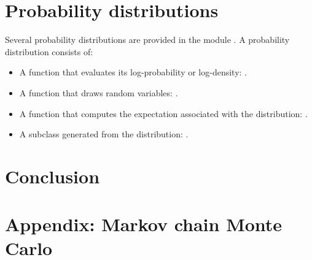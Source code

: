\documentclass[]{manual}
\begin{document}
\chapter{Probability distributions} 
\label{chap:distributions}
Several probability distributions are provided in the module . A probability distribution consists of:
\begin{itemize}
    \item A function that evaluates its log-probability or log-density: .
    \item A function that draws random variables: .
    \item A function that computes the expectation associated with the distribution: .
    \item A  subclass generated from the distribution: .
\end{itemize} 


\chapter{Conclusion} 
\label{chap:conclusion}
 

\appendix
\chapter{Appendix: Markov chain Monte Carlo} 
\label{chap:MCMC} 


\nocite{Bernardo:1992fk}


\end{document}
